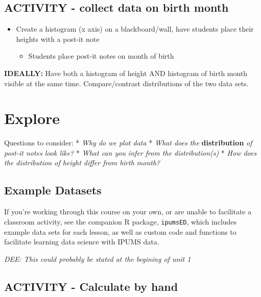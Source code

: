 \documentclass[
]{book}
\providecommand{\tightlist}{%
  \setlength{\itemsep}{0pt}\setlength{\parskip}{0pt}}
\begin{document}
\hypertarget{activity---collect-data-on-birth-month}{%
\subsection{ACTIVITY - collect data on birth month}\label{activity---collect-data-on-birth-month}}

\begin{itemize}
\tightlist
\item
  Create a histogram (x axis) on a blackboard/wall, have students place their heights
  with a post-it note

  \begin{itemize}
  \tightlist
  \item
    Students place post-it notes on month of birth
  \end{itemize}
\end{itemize}

\textbf{IDEALLY:} Have both a histogram of height AND histogram of birth month visible
at the same time. Compare/contrast distributions of the two data sets.

\hypertarget{explore-5}{%
\section*{Explore}\label{explore-5}}

Questions to consider:
* \emph{Why do we plot data}
* \emph{What does the} \textbf{distribution} \emph{of post-it notes look like?}
* \emph{What can you infer from the distribution(s)}
* \emph{How does the distribution of height differ from birth month?}

\hypertarget{example-datasets}{%
\subsection{Example Datasets}\label{example-datasets}}

If you're working through this course on your own, or are unable to facilitate a classroom activity, see the companion R package, \texttt{ipumsED}, which includes example data sets for each lesson, as well as custom code and functions to facilitate learning data science with IPUMS data.

\emph{DEE: This could probably be stated at the begining of unit 1}

\hypertarget{activity---calculate-by-hand}{%
\subsection{ACTIVITY - Calculate by hand}\label{activity---calculate-by-hand}}
\end{document}
